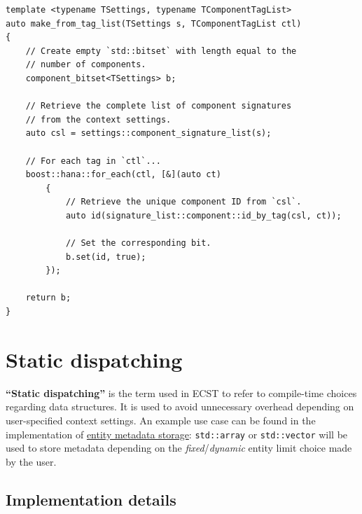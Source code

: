 \documentclass[twoside, 12pt, a4paper, openany]{book}
\begin{document}
\begin{verbatim}
template <typename TSettings, typename TComponentTagList>
auto make_from_tag_list(TSettings s, TComponentTagList ctl)
{
    // Create empty `std::bitset` with length equal to the
    // number of components.
    component_bitset<TSettings> b;

    // Retrieve the complete list of component signatures
    // from the context settings.
    auto csl = settings::component_signature_list(s);

    // For each tag in `ctl`...
    boost::hana::for_each(ctl, [&](auto ct)
        {
            // Retrieve the unique component ID from `csl`.
            auto id(signature_list::component::id_by_tag(csl, ct));

            // Set the corresponding bit.
            b.set(id, true);
        });

    return b;
}
\end{verbatim}

\hypertarget{appendix_static_dispatching}{\section{Static
dispatching}\label{appendix_static_dispatching}}

\textbf{``Static dispatching''} is the term used in ECST to refer to
compile-time choices regarding data structures. It is used to avoid
unnecessary overhead depending on user-specified context settings. An
example use case can be found in the implementation of
\protect\hyperlink{storage_entity}{entity metadata storage}:
\texttt{std::array}
or
\texttt{std::vector}
will be used to store metadata depending on the
\emph{fixed}/\emph{dynamic} entity limit choice made by the user.

\subsection{Implementation details}\label{implementation-details-5}
\end{document}
